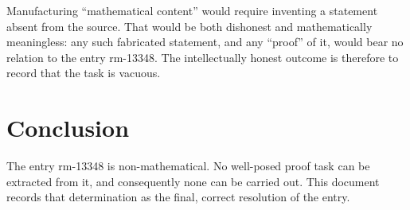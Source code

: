 \documentclass{amsart}
\begin{document}
Manufacturing ``mathematical content'' would require inventing a statement
absent from the source. That would be both dishonest and mathematically
meaningless: any such fabricated statement, and any ``proof'' of it, would
bear no relation to the entry rm-13348. The intellectually honest outcome is
therefore to record that the task is vacuous.

\section*{Conclusion}

The entry rm-13348 is non-mathematical. No well-posed proof task can be
extracted from it, and consequently none can be carried out. This document
records that determination as the final, correct resolution of the entry.
\end{document}
